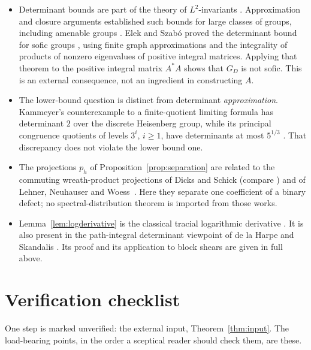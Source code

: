 \documentclass[11pt]{article}
\theoremstyle{remark}
\numberwithin{equation}{section}
\begin{document}
\begin{itemize}[leftmargin=2em]
\item Determinant bounds are part of the theory of $L^2$-invariants \cite{Luck2002}. Approximation and closure arguments established such bounds for large classes of groups, including amenable groups \cite[Theorem 1.21, with its erratum]{Schick2001}. Elek and Szab\'o proved the determinant bound for sofic groups \cite[Theorem 5]{ElekSzabo2005}, using finite graph approximations and the integrality of products of nonzero eigenvalues of positive integral matrices. Applying that theorem to the positive integral matrix $A^*A$ shows that $G_D$ is not sofic. This is an external consequence, not an ingredient in constructing $A$.
\item The lower-bound question is distinct from determinant \emph{approximation}. Kammeyer's counterexample to a finite-quotient limiting formula has determinant $2$ over the discrete Heisenberg group, while its principal congruence quotients of levels $3^i$, $i\ge1$, have determinants at most $5^{1/3}$ \cite[Theorem 2 and Section 2]{Kammeyer2026}. That discrepancy does not violate the lower bound one.
\item The projections $p_h$ of Proposition~\ref{prop:separation} are related to the commuting wreath-product projections of Dicks and Schick \cite[Section 3]{DicksSchick2002} (compare \cite[Lemmas 3.1 and 3.4]{DicksSchick2002}) and of Lehner, Neuhauser and Woess~\cite[Section 2]{LehnerNeuhauserWoess2008}. Here they separate one coefficient of a binary defect; no spectral-distribution theorem is imported from those works.
\item Lemma~\ref{lem:logderivative} is the classical tracial logarithmic derivative \cite[Lemma 2]{FK1952}. It is also present in the path-integral determinant viewpoint of de la Harpe and Skandalis \cite[Lemma 1 and Proposition 2(d)]{deLaHarpeSkandalis1984}. Its proof and its application to block shears are given in full above.
\end{itemize}

\section{Verification checklist}
\label{sec:checklist}

One step is marked unverified: the external input, Theorem~\ref{thm:input}. The load-bearing points, in the order a sceptical reader should check them, are these.
\end{document}
